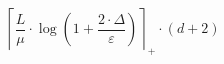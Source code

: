 \[\left\lceil \frac{L}{\mu} \cdot \log\left(1 + \frac{2 \cdot \Delta}{\varepsilon}\right) \right\rceil_{+} \cdot \left(d + 2\right)\]
